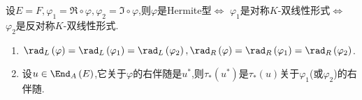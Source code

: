 \begin{proposition}{}{}
	设$E=F,\varphi_{1}=\Re\circ\varphi,\varphi_{2}=\Im\circ\varphi$,则$\varphi$是Hermite型$\iff$ $\varphi_{1}$是对称$K$-双线性形式$\iff$ $\varphi_{2}$是反对称$K$-双线性形式.
\end{proposition}

\begin{remark}{}{}
	\begin{enumerate}
		\item $\rad_{L}\left(\varphi\right)=\rad_{L}\left(\varphi_{1}\right)=\rad_{L}\left(\varphi_{2}\right),\rad_{R}\left(\varphi\right)=\rad_{R}\left(\varphi_{1}\right)=\rad_{R}\left(\varphi_{2}\right)$.
		\item 设$u\in\End_{A}\left(E\right)$,它关于$\varphi$的右伴随是$u^{\ast}$,则$\tau_{\ast}\left(u^{\ast}\right)$是$\tau_{\ast}\left(u\right)$关于$\varphi_{1}$(或$\varphi_{2}$)的右伴随.
	\end{enumerate}
\end{remark}



